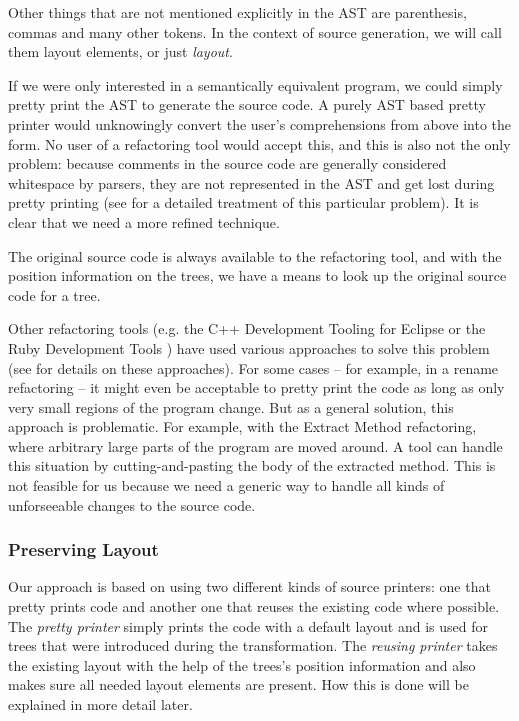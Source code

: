 Other things that are not mentioned explicitly in the AST are parenthesis, commas and many other tokens. In the context of source generation, we will call them layout elements, or just \textit{layout}. 

If we were only interested in a semantically equivalent program, we could simply pretty print the AST to generate the source code. A purely AST based pretty printer would unknowingly convert the user's  comprehensions from above into the  form. No user of a refactoring tool would accept this, and this is also not the only problem: because comments in the source code are generally considered whitespace by parsers, they are not represented in the AST and get lost during pretty printing (see \cite{RetainingComments} for a detailed treatment of this particular problem). It is clear that we need a more refined technique.

The original source code is always available to the refactoring tool, and with the position information on the trees, we have a means to look up the original source code for a tree.

Other refactoring tools (e.g. the C++ Development Tooling for Eclipse \cite{CdtOopsla} or the Ruby Development Tools \cite{RubyOopsla}) have used various approaches to solve this problem (see \cite{ScalaRefactoring} for details on these approaches). For some cases -- for example, in a rename refactoring -- it might even be acceptable to pretty print the code as long as only very small regions of the program change. But as a general solution, this approach is problematic. For example, with the Extract Method refactoring, where arbitrary large parts of the program are moved around. A tool can handle this situation by cutting-and-pasting the body of the extracted method. This is not feasible for us because we need a generic way to handle all kinds of unforseeable changes to the source code.

\subsubsection{Preserving Layout}

Our approach is based on using two different kinds of source printers: one that pretty prints code  and another one that reuses the existing code where possible. The \textit{pretty printer} simply prints the code with a default layout and is used for trees that were introduced during the transformation. The \textit{reusing printer} takes the existing layout with the help of the trees's position information and also makes sure all needed layout elements are present. How this is done will be explained in more detail later.

